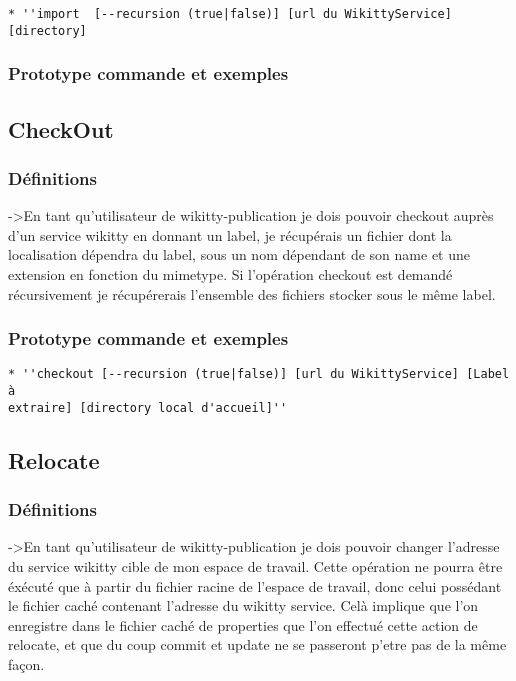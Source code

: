 \documentclass{article}
\begin{document}
\begin{verbatim}
* ''import  [--recursion (true|false)] [url du WikittyService] [directory]
\end{verbatim}

\subsubsection{Prototype commande et exemples}

\subsection{CheckOut}
\subsubsection{Définitions}

->En tant qu'utilisateur de wikitty-publication je dois pouvoir 
checkout auprès d'un service wikitty en donnant un label,
je récupérais un fichier dont la localisation dépendra du label, sous
un nom dépendant de son name et une extension en fonction du mimetype.
Si l'opération checkout est demandé récursivement je récupérerais l'ensemble
des fichiers stocker sous le même label.

\subsubsection{Prototype commande et exemples}
\begin{verbatim}
* ''checkout [--recursion (true|false)] [url du WikittyService] [Label à
extraire] [directory local d'accueil]''
\end{verbatim}

\subsection{Relocate}
\subsubsection{Définitions}
->En tant qu'utilisateur de wikitty-publication je dois pouvoir changer l'adresse du service
wikitty cible de mon espace de travail. Cette opération ne pourra être éxécuté que à partir du
fichier racine de l'espace de travail, donc celui possédant le fichier caché contenant 
l'adresse du wikitty service. Celà implique que l'on enregistre dans le fichier caché de properties que l'on 
effectué cette action de relocate, et que du coup commit et update ne se passeront p'etre pas de la même façon.
\end{document}
